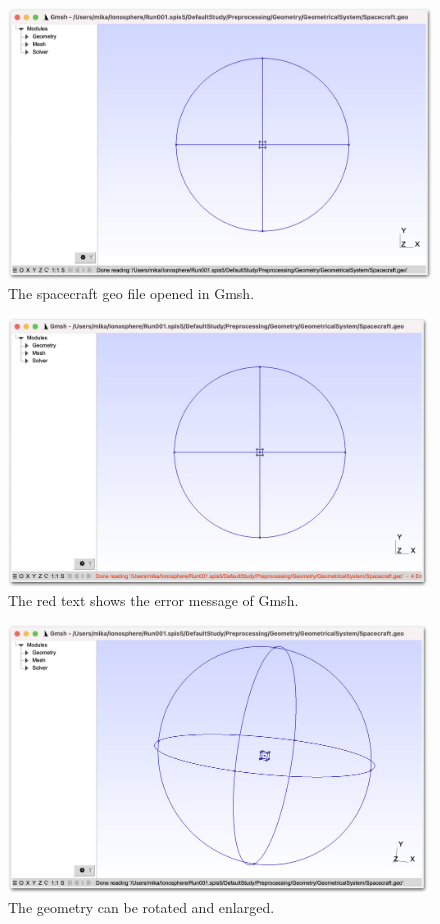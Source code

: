 \documentclass[a4paper, 12pt]{article}
\begin{document}
\begin{figure}[!ht]
    \centering
    \includegraphics[width=1\textwidth]{figA4.jpg}
    \caption{The spacecraft geo file opened in Gmsh.}
    \label{A4}
\end{figure}

\begin{figure}[!ht]
    \centering
    \includegraphics[width=0.99\textwidth]{figA5.jpg}
    \caption{The red text shows the error message of Gmsh.}
    \label{A5}
\end{figure}

\begin{figure}[!ht]
    \centering
    \includegraphics[width=0.99\textwidth]{figA6.jpg}
    \caption{The geometry can be rotated and enlarged.}
    \label{A6}
\end{figure}
\end{document}
